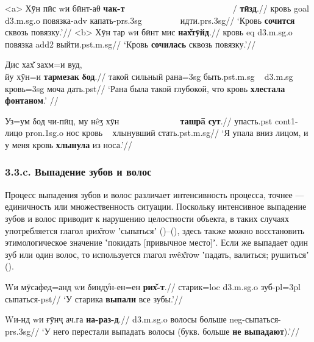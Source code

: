 \a<a> \begingl
\gla Хӯн пӣс wи бӣнт-аθ \textbf{чак-т} ~~~~~~~~~~~~~~~~~~~~~~~~ / \textbf{тӣзд}.//
\glc кровь {\sc goal} {\sc d3.m.sg.o} повязка-{\sc adv} капать-{\sc prs.3sg} ~ ~~~~~~ идти.{\sc prs.3sg}//
\glft ‘Кровь \textbf{сочится} сквозь повязку.’//
\endgl
\a<b> \begingl
\gla Хӯн тар wи бӣнт мис \textbf{нах̌тӯйд}.//
\glc кровь {\sc eq} {\sc d3.m.sg.o} повязка {\sc add2} выйти.{\sc pst.m.sg}//
\glft ‘Кровь \textbf{сочилась} сквозь повязку.’//
\endgl \xe

\begingl
\gla Дис хах̌ захм=и вуд, ~~~~~~~~~~~~~~~~~~~~~~~~~~~~~~~~~~~~~~~~~~~~~~~~~~~~~ йу хӯн=и \textbf{тармезак} \textbf{δод}.//
\glc такой сильный рана={\sc 3sg} быть.{\sc pst.m.sg} ~ {\sc d3.m.sg} кровь={\sc 3sg} моча дать.{\sc pst}//
\glft ‘Рана была такой глубокой, что кровь \textbf{хлестала фонтаном}.’ //
\endgl \xe

\begingl
\gla Уз=ум δод чи-пӣц, му нêӡ хӯн ~~~~~~~~~~~~~ \textbf{ташрā} \textbf{сут}.//
 упасть.{\sc pst} {\sc cont1}-лицо {\sc pron.1sg.o} нос кровь ~ хлынувший стать.{\sc pst.m.sg}//
\glft ‘Я упала вниз лицом, и у меня кровь \textbf{хлынула} из носа.’//
\endgl \xe

\subsubsection{3.3.c. Выпадение зубов и волос} \label{pour-33c}

Процесс выпадения зубов и волос различает интенсивность процесса, точнее — единичность или множественность ситуации. Поскольку интенсивное выпадение зубов и волос приводит к нарушению целостности объекта, в таких случаях употребляется глагол \i{рих̌тоw} ʽсыпатьсяʼ ()–(), здесь также можно восстановить этимологическое значение ʽпокидать [привычное место]ʼ. Если же выпадает один зуб или один волос, то используется глагол \i{wêх̌тоw} ʽпадать, валиться; рушитьсяʼ ().

\begingl
\gla Wи мӯсафед=анд wи δинду̊н-ен=ен \textbf{рих̌-т}.//
 старик={\sc loc} {\sc d3.m.sg.o} зуб-{\sc pl=3pl} сыпаться-{\sc pst}//
\glft ‘У старика \textbf{выпали} все зубы.’//
\endgl \xe

\begingl
\gla Wи-нд wи ғӯнҷ ач.га \textbf{на-раз-д}.//
 {\sc d3.m.sg.o} волосы больше {\sc neg}-сыпаться-{\sc prs.3sg}//
\glft ‘У него перестали выпадать волосы (букв. больше \textbf{не выпадают}).’//
\endgl \xe

